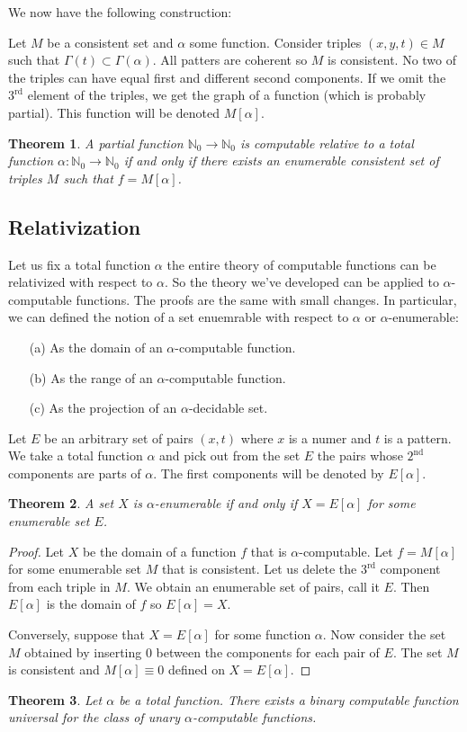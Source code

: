\documentclass[10pt, letterpaper]{article}
\newcommand{\N}{\mathbb{N}}
\newtheorem{thm}{Theorem}
\theoremstyle{remark}
\theoremstyle{definition}
\begin{document}
    We now have the following construction:

    Let $M$ be a consistent set and $\alpha$ some function. Consider triples $(x,y,t) \in M$ such that $\Gamma(t) \subset \Gamma(\alpha)$.
    All patters are coherent so $M$ is consistent. No two of the triples can have equal first and different second components. If we omit the 
    $3^{\text{rd}}$ element of the triples, we get the graph of a function (which is probably partial). This function will be 
    denoted $M[\alpha]$.

    \begin{thm}
        A partial function $\N_0 \rightarrow \N_0$ is computable relative to a total function $\alpha: \N_0 \rightarrow \N_0$ if and only if 
        there exists an enumerable consistent set of triples $M$ such that $f = M[\alpha]$.
    \end{thm}
    \subsection*{Relativization}

    Let us fix a total function $\alpha$ the entire theory of computable functions can be relativized with respect to $\alpha$. So the theory 
    we've developed can be applied to $\alpha$-computable functions. The proofs are the same with small changes. In particular, we can 
    defined the notion of a set enuemrable with respect to $\alpha$ or $\alpha$-enumerable:
    \begin{enumerate}
        \item [(a)] As the domain of an $\alpha$-computable function.
        \item [(b)] As the range of an $\alpha$-computable function.
        \item [(c)] As the projection of an $\alpha$-decidable set.
    \end{enumerate}

    Let $E$ be an arbitrary set of pairs $(x,t)$ where $x$ is a numer and $t$ is a pattern. We take a total function $\alpha$ and pick out from 
    the set $E$ the pairs whose $2^{\text{nd}}$ components are parts of $\alpha$. The first components will be denoted by $E[\alpha]$.

    \begin{thm}
        A set $X$ is $\alpha$-enumerable if and only if $X=E[\alpha]$ for some enumerable set $E$.
    \end{thm}

    \begin{proof}
        Let $X$ be the domain of a function $f$ that is $\alpha$-computable. Let $f=M[\alpha]$ for some enumerable set $M$ that is 
        consistent. Let us delete the $3^{\text{rd}}$ component from each triple in $M$. We obtain an enumerable set of pairs, call it $E$.
        Then $E[\alpha]$ is the domain of $f$ so $E[\alpha]=X$.

        Conversely, suppose that $X=E[\alpha]$ for some function $\alpha$. Now consider the set $M$ obtained by inserting 0 between the 
        components for each pair of $E$. The set $M$ is consistent and $M[\alpha] \equiv 0$ defined on $X=E[\alpha]$.
    \end{proof}

    \begin{thm}
        Let $\alpha$ be a total function. There exists a binary computable function universal for the class of unary $\alpha$-computable functions.
    \end{thm}
\end{document}
